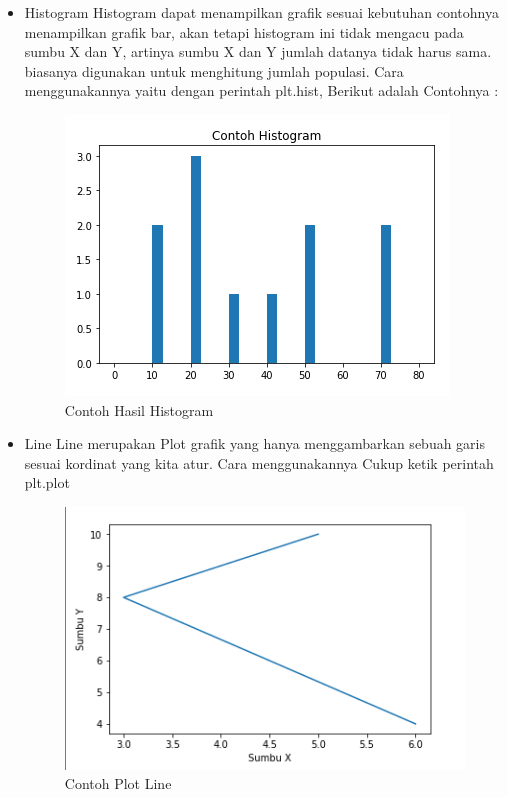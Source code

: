 \begin{itemize}	
	\item Histogram\newline
	Histogram dapat menampilkan grafik sesuai kebutuhan contohnya menampilkan grafik bar, akan tetapi histogram ini
	tidak mengacu pada sumbu X dan Y, artinya sumbu X dan Y jumlah datanya tidak harus sama. biasanya digunakan
	untuk menghitung jumlah populasi.\newline
	Cara menggunakannya yaitu dengan perintah plt.hist, Berikut adalah Contohnya :

	

\begin{figure}[h]
\centering
\includegraphics[scale=0.9]{figures/6/Teori/1174002/no3histogram.png}
\caption{Contoh Hasil Histogram}
\label{fig:contoh}
\end{figure}
\end{itemize}

\begin{itemize}
	\item Line\newline
	Line merupakan Plot grafik yang hanya menggambarkan sebuah garis sesuai kordinat yang kita atur.
	Cara menggunakannya Cukup ketik perintah plt.plot

	

\begin{figure}[h]
\centering
\includegraphics[scale=0.6]{figures/6/Teori/1174002/no2.png}
\caption{Contoh Plot Line}
\label{fig:contoh}
\end{figure}
\end{itemize}

